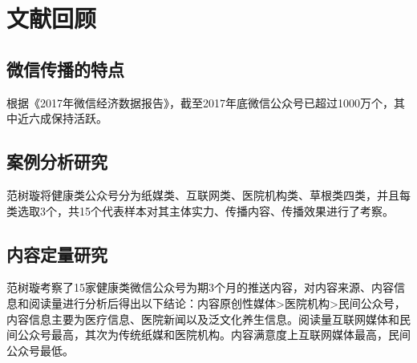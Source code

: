 \section{文献回顾}
\subsection{微信传播的特点}
根据《2017年微信经济数据报告》，截至2017年底微信公众号已超过1000万个，其中近六成保持活跃。
\subsection{案例分析研究}
范树璇\cite{}将健康类公众号分为纸媒类、互联网类、医院机构类、草根类四类，并且每类选取3个，共15个代表样本对其主体实力、传播内容、传播效果进行了考察。

\subsection{内容定量研究}
范树璇考察了15家健康类微信公众号为期3个月的推送内容，对内容来源、内容信息和阅读量进行分析后得出以下结论：内容原创性媒体>医院机构>民间公众号，内容信息主要为医疗信息、医院新闻以及泛文化养生信息。阅读量互联网媒体和民间公众号最高，其次为传统纸媒和医院机构。内容满意度上互联网媒体最高，民间公众号最低。